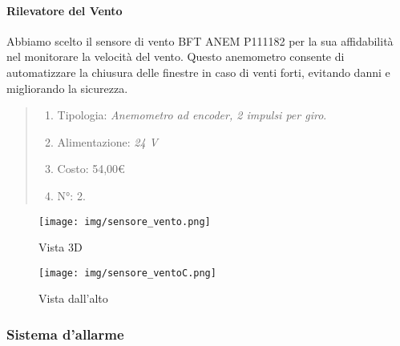 \documentclass[italian, 12pt, a4paper]{article}
\begin{document}
\paragraph{Rilevatore del Vento}
Abbiamo scelto il sensore di vento BFT ANEM P111182 per la sua affidabilità nel monitorare la velocità del vento. Questo anemometro consente di automatizzare la chiusura delle finestre in caso di venti forti, evitando danni e migliorando la sicurezza.
\begin{quote}
    \begin{enumerate}
        \item Tipologia: \emph{Anemometro ad encoder, 2 impulsi per giro}.
        \item Alimentazione: \emph{24 V}
        \item Costo: 54,00€
        \item N°: 2.
    \end{enumerate}
\end{quote}
\begin{figure}[h]
    \centering
    \begin{minipage}{0.45\textwidth}
        \centering
        \texttt{[image: img/sensore\_vento.png]}
        \caption{Vista 3D}
    \end{minipage} \hfill
    \begin{minipage}{0.45\textwidth}
        \centering
        \texttt{[image: img/sensore\_ventoC.png]}
        \caption{Vista dall'alto}
    \end{minipage}
\end{figure}
\clearpage
\subsubsection{Sistema d'allarme}
\end{document}
